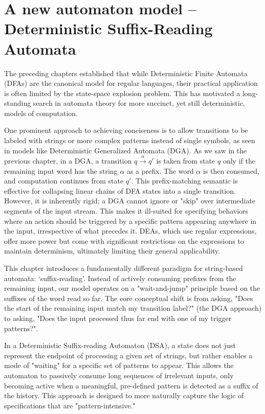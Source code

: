 
\chapter{A new automaton model -- Deterministic Suffix-Reading Automata}
\label{sec:new-automaton-model}

The preceding chapters established that while Deterministic Finite Automata (DFAs) are the canonical model for regular languages, their practical application is often limited by the state-space explosion problem. This has motivated a long-standing search in automata theory for more succinct, yet still deterministic, models of computation.

One prominent approach to achieving conciseness is to allow transitions to be labeled with strings or more complex patterns instead of single symbols, as seen in models like Deterministic Generalized Automata (DGA). %
As we saw in the previous chapter, in a DGA, a transition $q \xrightarrow{\alpha} q'$ is taken from state $q$ only if the remaining input word has the string $\alpha$ as a prefix. The word $\alpha$ is then consumed, and computation continues from state $q'$. This prefix-matching semantic is effective for collapsing linear chains of DFA states into a single transition. However, it is inherently rigid; a DGA cannot ignore or "skip" over intermediate segments of the input stream. This makes it ill-suited for specifying behaviors where an action should be triggered by a specific pattern appearing anywhere in the input, irrespective of what precedes it. DEAs, which use regular expressions, offer more power but come with significant restrictions on the expressions to maintain determinism, ultimately limiting their general applicability.

This chapter introduces a fundamentally different paradigm for string-based automata: `suffix-reading'. Instead of actively consuming prefixes from the remaining input, our model operates on a "wait-and-jump" principle based on the suffixes of the word read so far. The core conceptual shift is from asking, "Does the start of the remaining input match my transition label?" (the DGA approach) to asking, "Does the input processed thus far end with one of my trigger patterns?".

In a Deterministic Suffix-reading Automaton (DSA), a state does not just represent the endpoint of processing a given set of strings, but rather enables a mode of "waiting" for a specific set of patterns to appear. This allows the automaton to passively consume long sequences of irrelevant inputs, only becoming active when a meaningful, pre-defined pattern is detected as a suffix of the history. This approach is designed to more naturally capture the logic of specifications that are "pattern-intensive."

